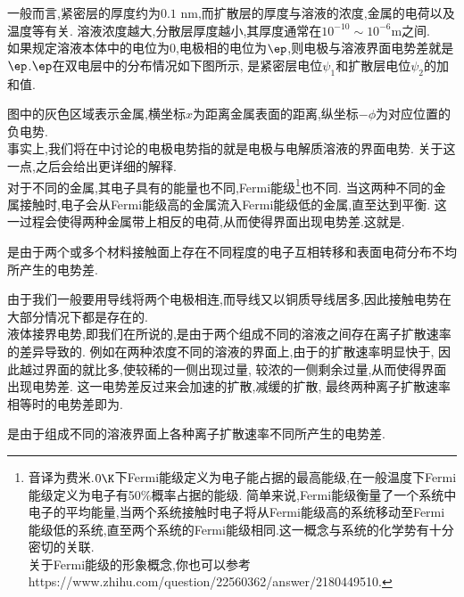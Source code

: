 \documentclass{ctexart}
\begin{document}
一般而言,紧密层的厚度约为$0.1\text{ nm}$,而扩散层的厚度与溶液的浓度,金属的电荷以及温度等有关.%
溶液浓度越大,分散层厚度越小,其厚度通常在$10^{-10}\sim10^{-6}\text{m}$之间.\\
\indent 如果规定溶液本体中的电位为$0$,电极相的电位为$\ep$,则电极与溶液界面电势差就是$\ep$.$\ep$在双电层中的分布情况如下图所示,%
是紧密层电位$\psi_1$和扩散层电位$\psi_2$的加和值.
\begin{tightcenter}
    
\end{tightcenter}
图中的灰色区域表示金属,横坐标$x$为距离金属表面的距离,纵坐标$-\phi$为对应位置的负电势.\\
\indent 事实上,我们将在中讨论的电极电势指的就是电极与电解质溶液的界面电势.%
关于这一点,之后会给出更详细的解释.\vspace{4pt}\\
\indent 对于不同的金属,其电子具有的能量也不同,Fermi能级\footnote{音译为费米.$0\K$下Fermi能级定义为电子能占据的最高能级,在一般温度下Fermi能级定义为电子有50\%概率占据的能级.%
简单来说,Fermi能级衡量了一个系统中电子的平均能量,当两个系统接触时电子将从Fermi能级高的系统移动至Fermi能级低的系统,直至两个系统的Fermi能级相同.这一概念与系统的化学势有十分密切的关联.\\
\indent 关于Fermi能级的形象概念,你也可以参考https://www.zhihu.com/question/22560362/answer/2180449510.}也不同.%
当这两种不同的金属接触时,电子会从Fermi能级高的金属流入Fermi能级低的金属,直至达到平衡.%
这一过程会使得两种金属带上相反的电荷,从而使得界面出现电势差.这就是.
\begin{definition}[6B.3.2 接触电势]
    是由于两个或多个材料接触面上存在不同程度的电子互相转移和表面电荷分布不均所产生的电势差.
\end{definition}
由于我们一般要用导线将两个电极相连,而导线又以铜质导线居多,因此接触电势在大部分情况下都是存在的.\vspace{4pt}\\
\indent 液体接界电势,即我们在所说的,是由于两个组成不同的溶液之间存在离子扩散速率的差异导致的.%
例如在两种浓度不同的溶液的界面上,由于的扩散速率明显快于,%
因此越过界面的就比多,使较稀的一侧出现过量,%
较浓的一侧剩余过量,从而使得界面出现电势差.%
这一电势差反过来会加速的扩散,减缓的扩散,%
最终两种离子扩散速率相等时的电势差即为.
\begin{definition}[6B.3.2 液体接界电势]
    是由于组成不同的溶液界面上各种离子扩散速率不同所产生的电势差.
\end{definition}
\end{document}
